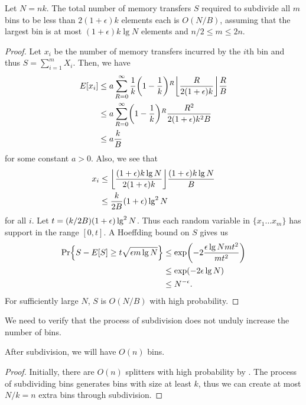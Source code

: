 \begin{theorem}
  Let $N=nk$.  The total number of memory transfers $S$ required to subdivide all $m$ bins to be less
  than $2(1+\epsilon)k$ elements each is $O(N/B)$, assuming that the largest bin is at most 
  $(1+\epsilon)k\lg N$ elements and $n/2 \leq m \leq 2n$.
\end{theorem}
\begin{proof}
  Let $x_i$ be the number of memory transfers incurred by the $i$th bin and
  thus $S=\sum_{i=1}^{m}X_i$.  Then, we have 
  \begin{align*}
    E[x_i] & \leq a \sum_{R=0}^{\infty} \frac{1}{k}\mathopen{}\left(1-\frac{1}{k}\right)\mathclose{}^R \mathopen{}\left\lfloor \frac{R}{2(1+\epsilon)k} \right\rfloor\mathclose{} \frac{R}{B}\\
    & \leq a \sum_{R=0}^{\infty} \mathopen{}\left(1-\frac{1}{k}\right)\mathclose{}^R \frac{R^2}{2(1+\epsilon)k^2B}\\
    & \leq a\frac{k}{B}\\
  \end{align*}
  for some constant $a>0$.
  Also, we see that
  \begin{align*}
    x_i &\leq \mathopen{}\left\lfloor \frac{(1+\epsilon)k\lg N}{2(1+\epsilon)k} \right\rfloor\mathclose{}\frac{(1+\epsilon)k\lg N}{B}\\
    &\leq \frac{k}{2B}(1+\epsilon) \lg ^2 N \\
  \end{align*}
  for all $i$.  Let $t = \mathopen{}\left(k/2B\right)\mathclose{}(1+\epsilon) \lg ^2 N$.  
  Thus each random variable in $\{ x_1 \ldots x_m \}$ has support
  in the range $[0, t]$.
  A Hoeffding bound on $S$ gives us
  \begin{align*}
    \Pr\mathopen{}\left\{ S - E[S] \geq t \sqrt{\epsilon m \lg N} \right\}\mathclose{} & \leq \exp \mathopen{}\left(-2\frac{\epsilon \lg N m t^2}{mt^2}\right)\mathclose{}\\
    & \leq \exp \mathopen{}\left(-2\epsilon \lg N\right)\mathclose{}\\
    & \leq N^{-\epsilon}.\\
  \end{align*}
  For sufficiently large $N$, $S$ is $O(N/B)$ with high probability.
\end{proof}

We need to verify that the process of subdivision does not unduly increase the number
of bins.

\begin{lemma}
After subdivision, we will have $O(n)$ bins.
\end{lemma}
\begin{proof}
Initially, there are $O(n)$ splitters with high probability by .
The process of subdividing bins generates bins with size at least $k$, thus we
can create at most $N/k = n$ extra bins through subdivision.
\end{proof}

